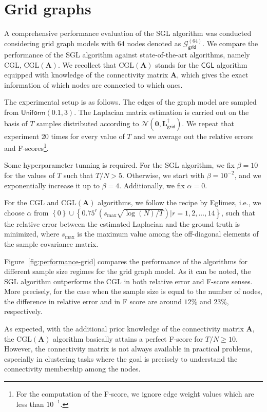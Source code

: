 \section{Grid graphs}
A comprehensive performance evaluation of the \textsf{SGL} algorithm was
conducted considering grid graph models with 64 nodes denoted as
$\mathcal{G}^{(64)}_{\mathsf{grid}}$.
We compare the performance of the \textsf{SGL} algorithm against state-of-the-art algorithms, namely
\textsf{CGL}, \textsf{CGL}$(\mathbf{A})$. We recollect that \textsf{CGL}$(\mathbf{A})$ stands for the
$\textsf{CGL}$ algorithm equipped with knowledge of the connectivity matrix $\mathbf{A}$, which gives
the exact information of which nodes are connected to which ones.

The experimental setup is as follows. The edges of the graph model are sampled from $\mathsf{Uniform}(0.1, 3)$.
The Laplacian matrix estimation is carried out on the basis of $T$ samples distributed according to
$\mathcal{N}(\mathbf{0}, \mathbf{L}_{\mathsf{grid}}^{\dagger})$. We repeat that experiment 20 times
for every value of $T$ and we average out the relative errors and F-scores\footnote{For the computation of the
F-score, we ignore edge weight values which are less than $10^{-1}$.}.

Some hyperparameter tunning is required. For the \textsf{SGL} algorithm, we fix
$\beta = 10$ for the values of $T$ such that $T / N > 5$. Otherwise, we start with
$\beta = 10^{-2}$, and we exponentially increase it up to $\beta = 4$.
Additionally, we fix $\alpha = 0$.

For the \textsf{CGL} and \textsf{CGL}$(\mathbf{A})$ algorithms, we follow the recipe by
Eglimez, i.e., we choose $\alpha$ from $\left\{0\right\}\cup\left\{0.75^{r}\left(s_{\text{max}}
\sqrt{\log(N) / T}\right) | r = 1, 2, ..., 14\right\}$, such that the relative error between
the estimated Laplacian and the ground truth is minimized, where $s_{\text{max}}$ is the
maximum value among the off-diagonal elements of the sample  covariance matrix.

Figure~\ref{fig:performance-grid} compares the performance of the algorithms for different
sample size regimes for the grid graph model. As it can be noted, the \textsf{SGL} algorithm outperforms the \textsf{CGL}
in both relative error and F-score senses. More precisely, for the case when the sample size is equal
to the number of nodes, the difference in relative error and in F score are around $12\%$ and $23\%$,
respectively.

As expected, with the additional prior knowledge of the connectivity matrix $\mathbf{A}$,
the \textsf{CGL}$(\mathbf{A})$ algorithm basically attains a perfect F-score for $T / N \geq 10$.
However, the connectivity matrix is not always available in practical problems, especially in clustering
tasks where the goal is precisely to understand the connectivity membership among the nodes.

